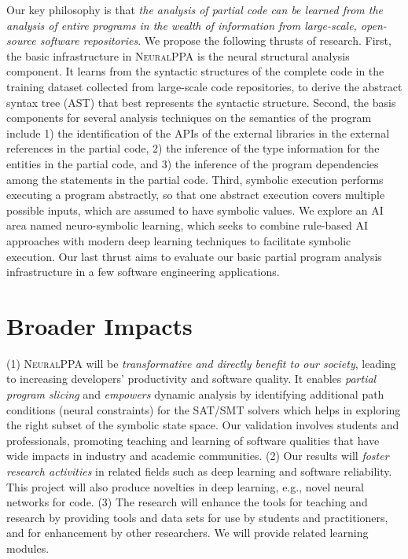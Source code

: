 \documentclass[11pt]{article}
\newcommand{\tool}{\textsc{NeuralPPA}\xspace}
\begin{document}
Our key philosophy is that {\em the analysis of partial code can be
  learned from the analysis of entire programs in the wealth of
  information from large-scale, open-source software
  repositories}. We propose the following thrusts of
research. First, the basic infrastructure in {\tool} is the neural
structural analysis component. It learns from the syntactic structures
of the complete code in the training dataset collected from
large-scale code repositories, to derive the abstract syntax tree
(AST) that best represents the syntactic structure.
Second, the basis components for several analysis techniques on the
semantics of the program include 1) the identification of the APIs of
the external libraries in the external references in the partial code,
2) the inference of the type information for the entities in the
partial code, and 3) the inference of the program dependencies among
the statements in the partial code. Third, symbolic execution performs
executing a program abstractly, so that one abstract execution covers
multiple possible inputs, which are assumed to have symbolic
values. We explore an AI area named neuro-symbolic
learning, which seeks to combine rule-based AI approaches
with modern deep learning techniques to facilitate symbolic execution.
Our last thrust aims to evaluate our basic partial
program analysis infrastructure in a few software engineering applications.


\section{Broader Impacts}


(1) {\tool} will be {\em transformative and directly benefit to our
  society}, leading to increasing developers’ productivity and
software quality.
It enables \textit{partial program slicing} and \emph{empowers}
dynamic analysis by identifying additional path conditions (neural
constraints) for the SAT/SMT solvers which helps in exploring the
right subset of the symbolic state space.
%
Our validation involves students and professionals, promoting teaching
and learning of software qualities that have wide impacts in industry
and academic communities. (2) Our results will {\em foster research
  activities} in related fields such as deep learning and software
reliability. This project will also produce novelties in deep learning,
e.g., novel neural networks for code. (3) The research will enhance
the tools for teaching and research by providing tools and
data sets for use by students and practitioners, and for enhancement
by other researchers. We will provide related learning modules.
\end{document}
